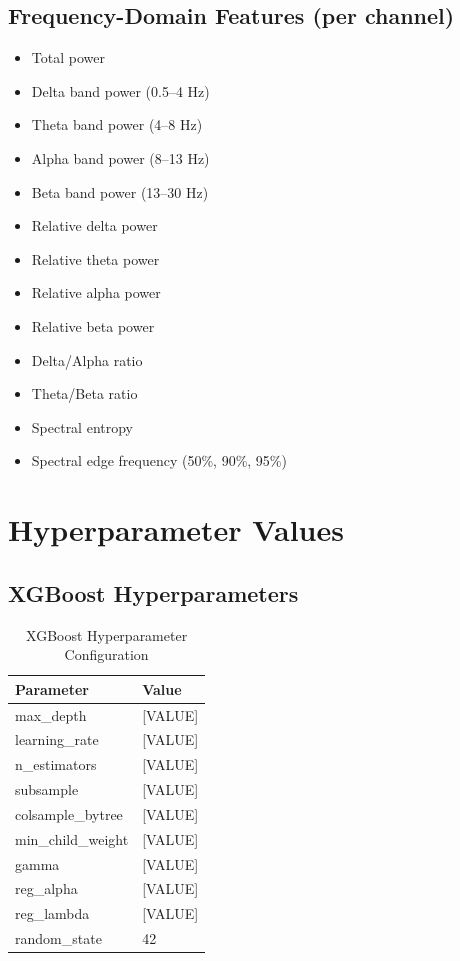 \subsection{Frequency-Domain Features (per channel)}
\label{app:freq_features}

\begin{itemize}
    \item Total power
    \item Delta band power (0.5--4 Hz)
    \item Theta band power (4--8 Hz)
    \item Alpha band power (8--13 Hz)
    \item Beta band power (13--30 Hz)
    \item Relative delta power
    \item Relative theta power
    \item Relative alpha power
    \item Relative beta power
    \item Delta/Alpha ratio
    \item Theta/Beta ratio
    \item Spectral entropy
    \item Spectral edge frequency (50\%, 90\%, 95\%)
\end{itemize}

\section{Hyperparameter Values}
\label{app:hyperparameters}


\subsection{XGBoost Hyperparameters}
\label{app:xgb_params}

\begin{table}[htbp]
    \centering
    \caption{XGBoost Hyperparameter Configuration}
    \begin{tabular}{ll}
        \toprule
        \textbf{Parameter} & \textbf{Value} \\
        \midrule
        max\_depth & [VALUE] \\
        learning\_rate & [VALUE] \\
        n\_estimators & [VALUE] \\
        subsample & [VALUE] \\
        colsample\_bytree & [VALUE] \\
        min\_child\_weight & [VALUE] \\
        gamma & [VALUE] \\
        reg\_alpha & [VALUE] \\
        reg\_lambda & [VALUE] \\
        random\_state & 42 \\
        \bottomrule
    \end{tabular}
\end{table}


